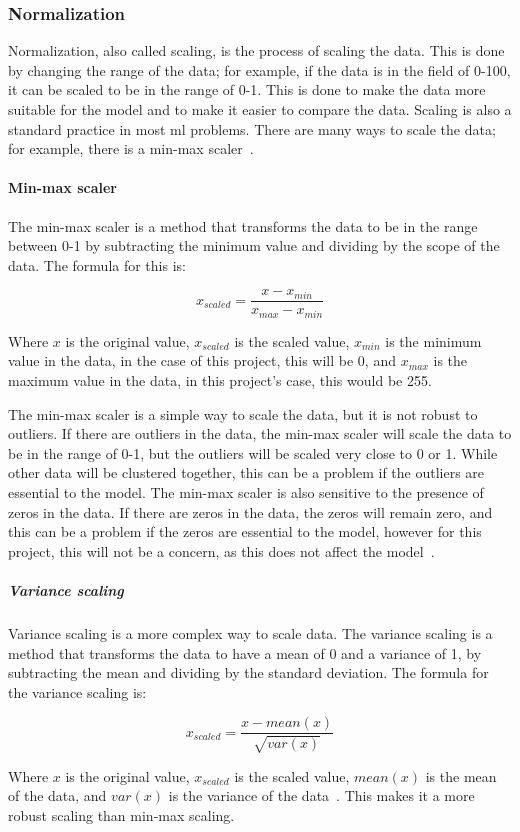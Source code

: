 \subsubsection{Normalization}\label{sec:normalization}
Normalization, also called scaling, is the process of scaling the data. This is done by changing the range of the data; for example, if the data is in the field of 0-100, it can be scaled to be in the range of 0-1. This is done to make the data more suitable for the model and to make it easier to compare the data. Scaling is also a standard practice in most \gls{ml} problems. There are many ways to scale the data; for example, there is a min-max scaler~\cite{Feature-engineering-zheng}.


\paragraph{Min-max scaler}\label{subsec:min-max}
The min-max scaler is a method that transforms the data to be in the range between 0-1 by subtracting the minimum value and dividing by the scope of the data. The formula for this is:

\begin{equation}
    x_{scaled} = \frac{x - x_{min}}{x_{max} - x_{min}}
\end{equation}

Where $x$ is the original value, $x_{scaled}$ is the scaled value, $x_{min}$ is the minimum value in the data, in the case of this project, this will be 0, and $x_{max}$ is the maximum value in the data, in this project's case, this would be 255.

The min-max scaler is a simple way to scale the data, but it is not robust to outliers. If there are outliers in the data, the min-max scaler will scale the data to be in the range of 0-1, but the outliers will be scaled very close to 0 or 1. While other data will be clustered together, this can be a problem if the outliers are essential to the model. The min-max scaler is also sensitive to the presence of zeros in the data. If there are zeros in the data, the zeros will remain zero, and this can be a problem if the zeros are essential to the model, however for this project, this will not be a concern, as this does not affect the model~\cite{Feature-engineering-zheng}.

\subparagraph{Variance scaling}\label{sec:variance-scaling}
Variance scaling is a more complex way to scale data. The variance scaling is a method that transforms the data to have a mean of 0 and a variance of 1, by subtracting the mean and dividing by the standard deviation. The formula for the variance scaling is:

\begin{equation}
    x_{scaled} = \frac{x - mean(x)}{\sqrt{var(x)}}
\end{equation}

Where $x$ is the original value, $x_{scaled}$ is the scaled value, $mean(x)$ is the mean of the data, and $var(x)$ is the variance of the data~\cite{Feature-engineering-zheng}. This makes it a more robust scaling than min-max scaling.